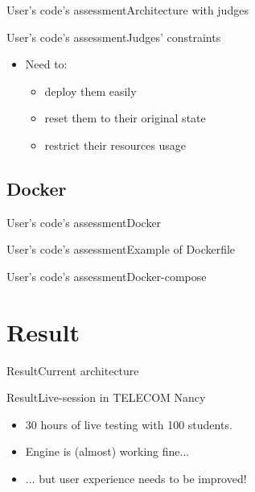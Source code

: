 \documentclass{beamer}
\begin{document}
\begin{frame}{User's code's assessment}{Architecture with judges}
\end{frame}

\begin{frame}{User's code's assessment}{Judges' constraints}
  \begin{itemize}
  \item {
    Need to:
    \begin{itemize}
    \item deploy them easily
    \item reset them to their original state
    \item restrict their resources usage
    \end{itemize}
  }
  \end{itemize}
\end{frame}

\subsection{Docker}

\begin{frame}{User's code's assessment}{Docker}
\end{frame}

\begin{frame}{User's code's assessment}{Example of Dockerfile}
\end{frame}

\begin{frame}{User's code's assessment}{Docker-compose}
\end{frame}

\section{Result}

\begin{frame}{Result}{Current architecture}
\end{frame}

\begin{frame}{Result}{Live-session in TELECOM Nancy}
  \begin{itemize}
  \item {
    30 hours of live testing with 100 students.
    \pause
  }
  \item {
    Engine is (almost) working fine...
    \pause
  }
  \item {
    ... but user experience needs to be improved!
  }
  \end{itemize}
\end{frame}
\end{document}
